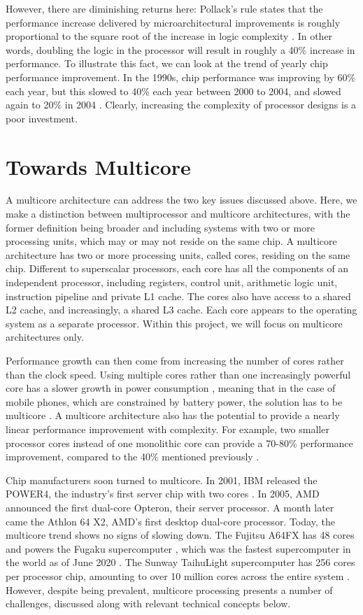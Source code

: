 \documentclass[bsc,frontabs,singlespacing,parskip,deptreport]{infthesis}
\begin{document}
However, there are diminishing returns here: Pollack’s rule states that the performance increase delivered by microarchitectural improvements is roughly proportional to the square root of the increase in logic complexity \cite{borkar_2007}. In other words, doubling the logic in the processor will result in roughly a 40\% increase in performance. To illustrate this fact, we can look at the trend of yearly chip performance improvement. In the 1990s, chip performance was improving by 60\% each year, but this slowed to 40\% each year between 2000 to 2004, and slowed again to 20\% in 2004 \cite{geer_2005}. Clearly, increasing the complexity of processor designs is a poor investment.

\section{Towards Multicore} \label{towards-multicore}
A multicore architecture can address the two key issues discussed above. Here, we make a distinction between multiprocessor and multicore architectures, with the former definition being broader and including systems with two or more processing units, which may or may not reside on the same chip. A multicore architecture has two or more processing units, called cores, residing on the same chip. Different to superscalar processors, each core has all the components of an independent processor, including registers, control unit, arithmetic logic unit, instruction pipeline and private L1 cache. The cores also have access to a shared L2 cache, and increasingly, a shared L3 cache. Each core appears to the operating system as a separate processor. Within this project, we will focus on multicore architectures only.

Performance growth can then come from increasing the number of cores rather than the clock speed. Using multiple cores rather than one increasingly powerful core has a slower growth in power consumption \cite{blake_2009}, meaning that in the case of mobile phones, which are constrained by battery power, the solution has to be multicore \cite{berkel_2009}. A multicore architecture also has the potential to provide a nearly linear performance improvement with complexity. For example, two smaller processor cores instead of one monolithic core can provide a 70-80\% performance improvement, compared to the 40\% mentioned previously \cite{borkar_2007}.

Chip manufacturers soon turned to multicore. In 2001, IBM released the POWER4, the industry’s first server chip with two cores \cite{power4}. In 2005, AMD announced the first dual-core Opteron, their server processor. A month later came the Athlon 64 X2, AMD’s first desktop dual-core processor. Today, the multicore trend shows no signs of slowing down. The Fujitsu A64FX has 48 cores and powers the Fugaku supercomputer \cite{a64fx}, which was the fastest supercomputer in the world as of June 2020 \cite{top500}. The Sunway TaihuLight supercomputer has 256 cores per processor chip, amounting to over 10 million cores across the entire system \cite{sunway}. However, despite being prevalent, multicore processing presents a number of challenges, discussed along with relevant technical concepts below.
\end{document}
